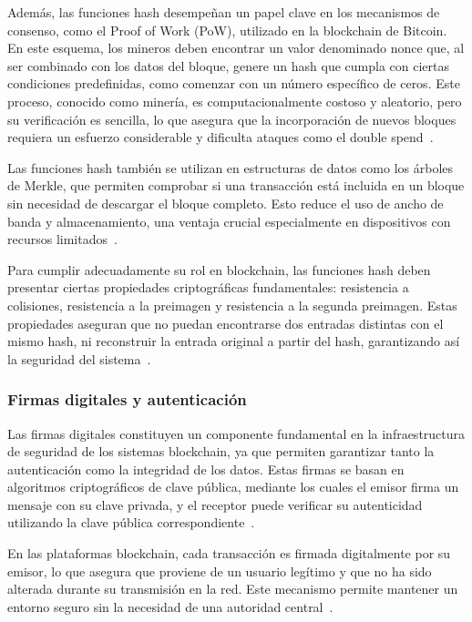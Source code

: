 Además, las funciones hash desempeñan un papel clave en los mecanismos de consenso, como el Proof of Work (PoW), utilizado en la blockchain de Bitcoin. En este esquema, los mineros deben encontrar un valor denominado nonce que, al ser combinado con los datos del bloque, genere un hash que cumpla con ciertas condiciones predefinidas, como comenzar con un número específico de ceros. Este proceso, conocido como minería, es computacionalmente costoso y aleatorio, pero su verificación es sencilla, lo que asegura que la incorporación de nuevos bloques requiera un esfuerzo considerable y dificulta ataques como el double spend~\cite{kabiri2005survey}.

Las funciones hash también se utilizan en estructuras de datos como los árboles de Merkle, que permiten comprobar si una transacción está incluida en un bloque sin necesidad de descargar el bloque completo. Esto reduce el uso de ancho de banda y almacenamiento, una ventaja crucial especialmente en dispositivos con recursos limitados~\cite{kent2006log}.

Para cumplir adecuadamente su rol en blockchain, las funciones hash deben presentar ciertas propiedades criptográficas fundamentales: resistencia a colisiones, resistencia a la preimagen y resistencia a la segunda preimagen. Estas propiedades aseguran que no puedan encontrarse dos entradas distintas con el mismo hash, ni reconstruir la entrada original a partir del hash, garantizando así la seguridad del sistema~\cite{axelsson2000base}.
\subsubsection{ Firmas digitales y autenticación}
Las firmas digitales constituyen un componente fundamental en la infraestructura de seguridad de los sistemas blockchain, ya que permiten garantizar tanto la autenticación como la integridad de los datos. Estas firmas se basan en algoritmos criptográficos de clave pública, mediante los cuales el emisor firma un mensaje con su clave privada, y el receptor puede verificar su autenticidad utilizando la clave pública correspondiente~\cite{stallings2017crypto}.

En las plataformas blockchain, cada transacción es firmada digitalmente por su emisor, lo que asegura que proviene de un usuario legítimo y que no ha sido alterada durante su transmisión en la red. Este mecanismo permite mantener un entorno seguro sin la necesidad de una autoridad central~\cite{nakamoto2008bitcoin}.

